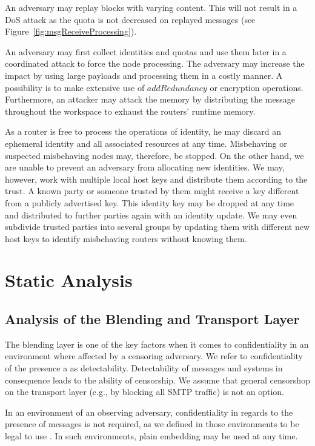 An adversary may replay blocks with varying content. This will not result in a DoS attack as the quota is not decreased on replayed messages (see Figure~\ref{fig:msgReceiveProcessing}).

An adversary may first collect identities and quotas and use them later in a coordinated attack to force the node processing. The adversary may increase the impact by using large payloads and processing them in a costly manner. A possibility is to make extensive use of $addRedundancy$ or encryption operations. Furthermore, an attacker may attack the memory by distributing the message throughout the workspace to exhaust the routers' runtime memory.

As a router is free to process the operations of identity, he may discard an ephemeral identity and all associated resources at any time. Misbehaving or suspected misbehaving nodes may, therefore, be stopped. On the other hand, we are unable to prevent an adversary from allocating new identities. We may, however, work with multiple local host keys and distribute them according to the trust. A known party or someone trusted by them might receive a key different from a publicly advertised key. This identity key may be dropped at any time and distributed to further parties again with an identity update. We may even subdivide trusted parties into several groups by updating them with different new host keys to identify misbehaving routers without knowing them. 

\chapter{Static Analysis}
\section{Analysis of the Blending and Transport Layer}\label{sec:analysisBlendingAndTransport}
The blending layer is one of the key factors when it comes to confidentiality in an environment where affected by a censoring adversary. We refer to confidentiality of the presence a \VortexNode{} as detectability. Detectability of messages and systems in consequence leads to the ability of censorship. We assume that general censorshop on the transport layer (e.g., by blocking all SMTP traffic) is not an option.

In an environment of an observing adversary, confidentiality in regards to the presence of messages is not required, as we defined in those environments to be legal to use \MessageVortex. In such environments, plain embedding may be used at any time.

